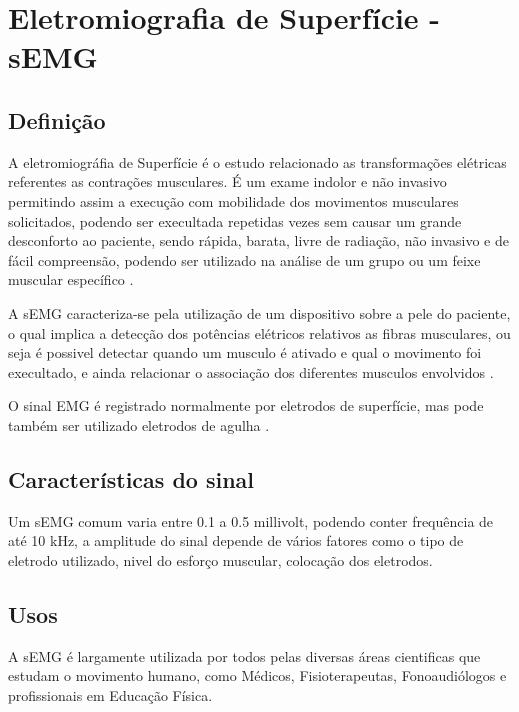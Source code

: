 \chapter{Eletromiografia de Superfície - sEMG}
\section{Definição}
A eletromiográfia de Superfície é o estudo relacionado as transformações elétricas referentes as contrações musculares. É um exame indolor e não invasivo permitindo assim a execução com mobilidade dos movimentos musculares solicitados, podendo ser execultada repetidas vezes sem causar um grande desconforto ao paciente, sendo rápida, barata, livre de radiação, não invasivo e de fácil compreensão, podendo ser utilizado na análise de um grupo ou um feixe muscular específico \cite{de2010eletromiografia}.

A sEMG caracteriza-se pela utilização de um dispositivo sobre a pele do paciente, o qual implica a detecção dos potências elétricos relativos as fibras musculares, ou seja é possivel detectar quando um musculo é ativado e qual o movimento foi execultado, e ainda relacionar o associação dos diferentes musculos envolvidos \cite{botelho2010avaliaccao}.

O sinal EMG é registrado normalmente por eletrodos de superfície, mas pode também ser utilizado eletrodos de agulha \cite{soderberg1984electromyography}.

\section{Características do sinal}

Um sEMG comum varia entre 0.1 a 0.5 millivolt, podendo conter frequência de até 10 kHz, a amplitude do sinal depende de vários fatores como o tipo de eletrodo utilizado, nivel do esforço muscular, colocação dos eletrodos.

\section{Usos}
A sEMG é largamente utilizada por todos pelas diversas áreas cientificas que estudam o movimento humano, como Médicos, Fisioterapeutas, Fonoaudiólogos e profissionais em Educação Física\cite{nascimento2012surface}.
